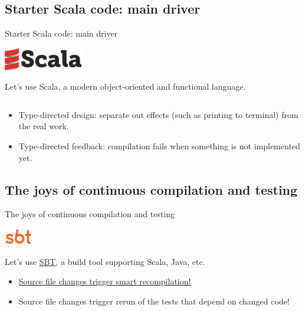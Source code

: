 \subsection{Starter Scala code: main driver}

\begin{frame}[fragile]{Starter Scala code: main driver}
  \begin{center}
    \includegraphics[height=1cm]{scala-logo-red-dark.png}
  \end{center}

  Let's use Scala, a modern \alert{object-oriented} and \alert{functional} language.

  \inputminted{scala}{Main1.scala}

  \begin{itemize}
  \item Type-directed design: separate out effects (such as printing to terminal) from the real work.
  \item Type-directed feedback: compilation fails when something is not implemented yet.
  \end{itemize}
\end{frame}

\subsection{The joys of continuous compilation and testing}

\begin{frame}[fragile]{The joys of continuous compilation and testing}
  \begin{center}
    \includegraphics[height=0.75cm]{sbt-logo-orange-600x360.png}
  \end{center}

  Let's use \href{http://www.scala-sbt.org/}{SBT}, a build tool supporting Scala, Java, etc.

  \begin{itemize}
  \item \href{http://www.scala-sbt.org/release/docs/Detailed-Topics/Triggered-Execution.html}{Source file changes trigger smart recompilation!}
  \item Source file changes trigger rerun of the tests that depend on changed code!
  \end{itemize}

  \inputminted{console}{testQuick.console}
\end{frame}

